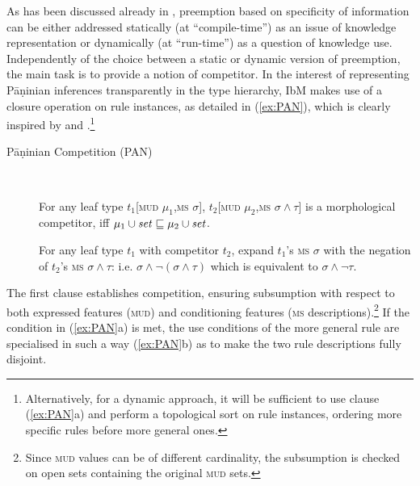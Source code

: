 \documentclass[output=paper
 	        ,biblatex
                ,babelshorthands
                ,newtxmath
                ,draftmode
                ,colorlinks, citecolor=brown
]{langscibook}
\begin{document}
\begin{exe}
\begin{xlist}
\begin{exe}
\begin{xlist}
As has been discussed already in \citet{Koenig99}, preemption based on
specificity of information can be either addressed statically (at
``compile-time'') as an issue of knowledge representation or
dynamically (at ``run-time'') as a question of knowledge
use. Independently of the choice between a static or dynamic version
of preemption, the main task is to provide a notion of competitor.  In
the interest of representing Pāṇinian inferences transparently in the
type hierarchy, IbM makes use of a closure operation on rule
instances, as detailed in (\ref{ex:PAN}), which is clearly inspired by
\citet{Koenig99} and \citet{Erjavec94}.\footnote{Alternatively, for 
a dynamic approach, it will be sufficient to use clause
(\ref{ex:PAN}a) and perform a topological sort on rule instances,
ordering  more specific rules before more general ones.}

\begin{samepage}
  \begin{exe}
    \ex \label{ex:PAN}\begin{description}
    \item[Pāṇinian Competition (PAN)] \mbox{~}
      \begin{xlist}
        \ex For any leaf type $t_1$[\textsc{mud} $\mu_1$,\textsc{ms}
        $\sigma$], $t_2$[\textsc{mud} $\mu_2$,\textsc{ms}
        $\sigma \wedge \tau$] is a morphological competitor, iff
        $\mu_1 \cup \mbox{\textit{set}} \sqsubseteq \mu_2 \cup \mbox{\textit{set}}$.
    
        \ex For any leaf type $t_1$ with competitor $t_2$, expand
        $t_1$'s \textsc{ms} $\sigma$ with the negation of $t_2$'s
        \textsc{ms} $\sigma \wedge \tau$: i.e.
        $\sigma \wedge \neg(\sigma \wedge \tau)$ which is equivalent
        to $\sigma \wedge
        \neg \tau$.
      \end{xlist}
    \end{description}
  \end{exe}
\end{samepage}

The first clause establishes competition, ensuring subsumption with
respect to both expressed features (\textsc{mud}) and conditioning
features (\textsc{ms} descriptions).\footnote{Since \textsc{mud} values
  can be of different cardinality, the subsumption  is checked
  on  open sets containing the original \textsc{mud} sets. } If the
condition in (\ref{ex:PAN}a) is met, the use
conditions of the more general rule are specialised in such a way (\ref{ex:PAN}b) as
to make the two rule descriptions fully disjoint.


\end{xlist}
\end{exe}
\end{xlist}
\end{exe}
\end{document}

